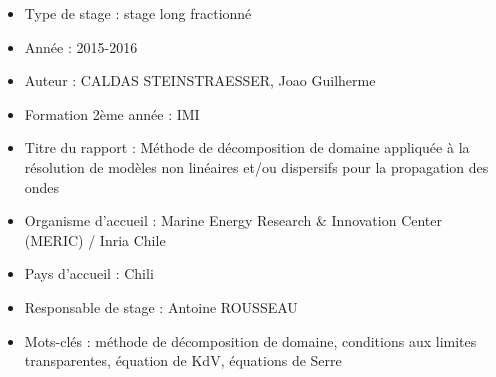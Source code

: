 \begin{itemize}

\item Type de stage : stage long fractionné

\item Année : 2015-2016

\item Auteur : CALDAS STEINSTRAESSER, Joao Guilherme

\item Formation 2ème année : IMI

\item Titre du rapport : Méthode de décomposition de domaine appliquée à la résolution de modèles non linéaires et/ou dispersifs pour la propagation des ondes

\item Organisme d’accueil : Marine Energy Research \& Innovation Center (MERIC) / Inria Chile

\item Pays d’accueil : Chili

\item Responsable de stage : Antoine ROUSSEAU

\item Mots-clés : méthode de décomposition de domaine, conditions aux limites transparentes, équation de KdV, équations de Serre

\end{itemize}